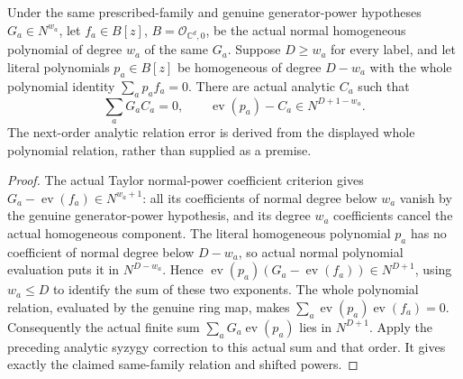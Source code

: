 \begin{theorem}
\label{hir:actual-prescribed-canonical-relative-initial-syzygy}
\leanok
Under the same prescribed-family and genuine generator-power hypotheses
$G_a\in N^{w_a}$, let $f_a\in B[z]$,
$B=\mathcal O_{\mathbb C^d,0}$, be the actual
normal homogeneous polynomial of degree $w_a$ of the same $G_a$.
Suppose $D\ge w_a$ for every label, and let literal polynomials
$p_a\in B[z]$ be homogeneous of degree $D-w_a$ with the whole
polynomial identity $\sum_ap_af_a=0$. There are actual analytic
$C_a$ such that
\[
 \sum_aG_aC_a=0,\qquad
 \operatorname{ev}(p_a)-C_a\in N^{D+1-w_a}.
\]
The next-order analytic relation error is derived from the displayed
whole polynomial relation, rather than supplied as a premise.
\end{theorem}
\begin{proof}
The actual Taylor normal-power coefficient criterion gives
$G_a-\operatorname{ev}(f_a)\in N^{w_a+1}$: all its coefficients of
normal degree below $w_a$ vanish by the genuine generator-power
hypothesis, and its degree $w_a$ coefficients cancel the actual
homogeneous component. The literal homogeneous polynomial $p_a$ has no
coefficient of normal degree below $D-w_a$, so actual normal polynomial
evaluation puts it in $N^{D-w_a}$. Hence
$\operatorname{ev}(p_a)(G_a-\operatorname{ev}(f_a))\in N^{D+1}$,
using $w_a\le D$ to identify the sum of these two exponents.
The whole polynomial relation, evaluated by the genuine ring map,
makes $\sum_a\operatorname{ev}(p_a)\operatorname{ev}(f_a)=0$.
Consequently the actual finite sum
$\sum_aG_a\operatorname{ev}(p_a)$ lies in $N^{D+1}$. Apply the
preceding analytic syzygy correction to this actual sum and that order.
It gives exactly the claimed same-family relation and shifted powers.
\end{proof}

